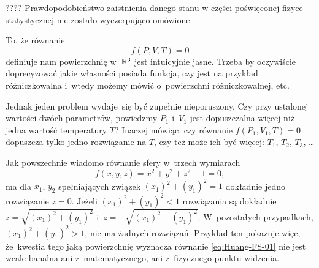 \documentclass[a4paper,11pt]{article}
\begin{document}
\vspace{\spaceFour}



???? Prawdopodobieństwo zaistnienia danego stanu w części poświęconej fizyce
statystycznej nie zostało wyczerpująco omówione.







\start {} To, że równanie
\begin{equation}
  \label{eq:Huang-FS-01}
  f( P, V, T ) = 0
\end{equation}
definiuje nam powierzchnię w~$\mathbb{R}^{ 3 }$ jest intuicyjnie jasne. Trzeba by oczywiście doprecyzować jakie własności posiada funkcja, czy jest na przykład różniczkowalna i~wtedy możemy mówić o~powierzchni różniczkowalnej, etc.

Jednak jeden problem wydaje~się być zupełnie nieporuszony. Czy przy ustalonej wartości dwóch parametrów, powiedzmy $P_{ 1 }$ i~$V_{ 1 }$ jest dopuszczalna więcej niż jedna wartość temperatury $T$? Inaczej mówiąc, czy równanie $f( P_{ 1 }, V_{ 1 }, T ) = 0$ dopuszcza tylko jedno rozwiązanie na $T$, czy też może ich być więcej: $T_{ 1 }$, $T_{ 2 }$, $T_{ 3 }$, \ldots

Jak powszechnie wiadomo równanie sfery w~trzech wymiarach
\begin{equation}
  \label{eq:Huang-FS-02}
  f( x, y, z ) = x^{ 2 } + y^{ 2 } + z^{ 2 } - 1 = 0,
\end{equation}
ma dla $x_{ 1 }$, $y_{ 2 }$ spełniających związek
$( x_{ 1 } )^{ 2 } + ( y_{ 1 } )^{ 2 } = 1$ dokładnie jedno rozwiązanie
$z = 0$. Jeżeli $( x_{ 1 } )^{ 2 } + ( y_{ 1 } )^{ 2 } < 1$ rozwiązania są
dokładnie $z = \sqrt{ ( x_{ 1 } )^{ 2 } + ( y_{ 1 } )^{ 2 } }$
i~$z = -\sqrt{ ( x_{ 1 } )^{ 2 } + ( y_{ 1 } )^{ 2 } }$. W~pozostałych
przypadkach, $( x_{ 1 } )^{ 2 } + ( y_{ 1 } )^{ 2 } > 1$, nie ma żadnych
rozwiązań. Przykład ten pokazuje więc, że~kwestia tego jaką powierzchnię
wyznacza równanie \eqref{eq:Huang-FS-01} nie jest wcale banalna ani
z~matematycznego, ani z~fizycznego punktu widzenia.










\end{document}
